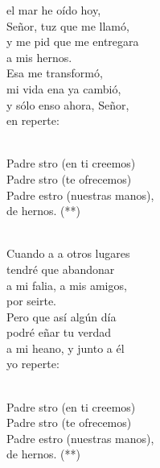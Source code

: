 \documentclass[12pt]{article}
\begin{document}
\begin{multicols*}{2}
\begin{cancion}%
	el mar he oído hoy,\\
	Señor, tuz que me llamó,\\
	y me pid que me entregara \\
	a mis hernos.\\
	Esa  me transformó,\\
	mi vida ena ya cambió,\\
	y sólo enso ahora, Señor,\\
	en reperte:\\\jump\\
	\begin{chorus}%
	Padre stro (en ti creemos)\\
	Padre stro (te ofrecemos)\\
	Padre estro (nuestras manos),\\
	de hernos. (**)\\
	\end{chorus}%
	\jump\\
	Cuando a a otros lugares\\
	tendré que abandonar\\
	a mi falia, a mis amigos,\\
	por seirte.\\
	Pero  que así algún día\\
	podré eñar tu verdad\\
	a mi heano, y junto a él\\
	yo reperte:\\\jump\\
	\begin{chorus}%
	Padre stro (en ti creemos)\\
	Padre stro (te ofrecemos)\\
	Padre estro (nuestras manos),\\
	de hernos. (**)\\
	\end{chorus}%
	\jump\\
\end{cancion}%


\end{multicols*}
\end{document}
